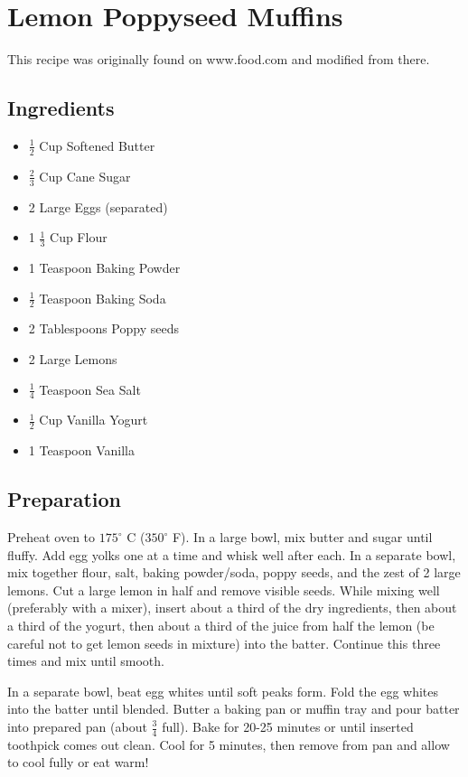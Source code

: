 \thispagestyle{fancy}
\section{Lemon Poppyseed Muffins}
\AddToShipoutPicture*{\LemonPoppyseed}

This recipe was originally found on www.food.com and modified from there.

\subsection*{Ingredients}
\begin{multicols}{3}
	\begin{itemize}
		\item $\frac{1}{2}$ Cup Softened Butter
		\item $\frac{2}{3}$ Cup Cane Sugar
		\item 2 Large Eggs (separated)
		\item 1 $\frac{1}{3}$ Cup Flour
		\item 1 Teaspoon Baking Powder
		\item $\frac{1}{2}$ Teaspoon Baking Soda
		\item 2 Tablespoons Poppy seeds
		\item 2 Large Lemons
		\item $\frac{1}{4}$ Teaspoon Sea Salt
		\item $\frac{1}{2}$ Cup Vanilla Yogurt
		\item 1 Teaspoon Vanilla
	\end{itemize}
\end{multicols}

\subsection*{Preparation}

Preheat oven to $175^\circ$ C ($350^\circ$ F). In a large bowl, mix butter and sugar until fluffy. Add egg yolks one at a time and whisk well after each. In a separate bowl, mix together flour, salt, baking powder/soda, poppy seeds, and the zest of 2 large lemons. Cut a large lemon in half and remove visible seeds. While mixing well (preferably with a mixer), insert about a third of the dry ingredients, then about a third of the yogurt, then about a third of the juice from half the lemon (be careful not to get lemon seeds in mixture) into the batter. Continue this three times and mix until smooth. 

In a separate bowl, beat egg whites until soft peaks form. Fold the egg whites into the batter until blended. Butter a baking pan or muffin tray and pour batter into prepared pan (about $\frac{3}{4}$ full). Bake for 20-25 minutes or until inserted toothpick comes out clean. Cool for 5 minutes, then remove from pan and allow to cool fully or eat warm!

